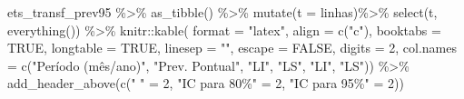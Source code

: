 \documentclass[
  letterpaper,
  DIV=11,
  numbers=noendperiod]{scrartcl}
\newenvironment{Shaded}{\begin{snugshade}}{\end{snugshade}}
\newcommand{\AttributeTok}[1]{\textcolor[rgb]{0.40,0.45,0.13}{#1}}
\newcommand{\ConstantTok}[1]{\textcolor[rgb]{0.56,0.35,0.01}{#1}}
\newcommand{\DecValTok}[1]{\textcolor[rgb]{0.68,0.00,0.00}{#1}}
\newcommand{\FunctionTok}[1]{\textcolor[rgb]{0.28,0.35,0.67}{#1}}
\newcommand{\NormalTok}[1]{\textcolor[rgb]{0.00,0.23,0.31}{#1}}
\newcommand{\OtherTok}[1]{\textcolor[rgb]{0.00,0.23,0.31}{#1}}
\newcommand{\SpecialCharTok}[1]{\textcolor[rgb]{0.37,0.37,0.37}{#1}}
\newcommand{\StringTok}[1]{\textcolor[rgb]{0.13,0.47,0.30}{#1}}
\begin{document}
\begin{Shaded}
\begin{Highlighting}[]
\NormalTok{ets\_transf\_prev95 }\SpecialCharTok{\%\textgreater{}\%} 
  \FunctionTok{as\_tibble}\NormalTok{() }\SpecialCharTok{\%\textgreater{}\%}
  \FunctionTok{mutate}\NormalTok{(}\AttributeTok{t =}\NormalTok{ linhas)}\SpecialCharTok{\%\textgreater{}\%}
  \FunctionTok{select}\NormalTok{(t, }\FunctionTok{everything}\NormalTok{()) }\SpecialCharTok{\%\textgreater{}\%}
\NormalTok{  knitr}\SpecialCharTok{::}\FunctionTok{kable}\NormalTok{(}
      \AttributeTok{format =} \StringTok{"latex"}\NormalTok{,}
      \AttributeTok{align =} \FunctionTok{c}\NormalTok{(}\StringTok{"c"}\NormalTok{),}
      \AttributeTok{booktabs =} \ConstantTok{TRUE}\NormalTok{,}
      \AttributeTok{longtable =} \ConstantTok{TRUE}\NormalTok{,}
      \AttributeTok{linesep =} \StringTok{""}\NormalTok{,}
      \AttributeTok{escape =} \ConstantTok{FALSE}\NormalTok{,}
      \AttributeTok{digits =} \DecValTok{2}\NormalTok{,}
      \AttributeTok{col.names =} \FunctionTok{c}\NormalTok{(}\StringTok{"Período (mês/ano)"}\NormalTok{, }\StringTok{"Prev. Pontual"}\NormalTok{, }\StringTok{"LI"}\NormalTok{, }\StringTok{"LS"}\NormalTok{, }\StringTok{"LI"}\NormalTok{, }\StringTok{"LS"}\NormalTok{)) }\SpecialCharTok{\%\textgreater{}\%}
    \FunctionTok{add\_header\_above}\NormalTok{(}\FunctionTok{c}\NormalTok{(}\StringTok{" "} \OtherTok{=} \DecValTok{2}\NormalTok{, }\StringTok{"IC para 80\%"} \OtherTok{=} \DecValTok{2}\NormalTok{, }\StringTok{"IC para 95\%"} \OtherTok{=} \DecValTok{2}\NormalTok{))}
\end{Highlighting}
\end{Shaded}
\end{document}
